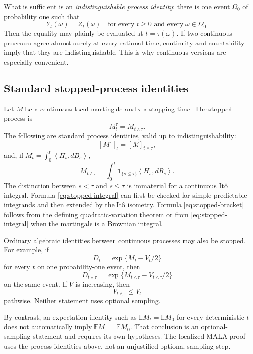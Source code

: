 \documentclass[11pt]{article}
\newcommand{\E}{\mathbb E}
\newcommand{\ip}[2]{\left\langle #1,#2\right\rangle}
\newcommand{\1}{\mathbf 1}
\begin{document}
What is sufficient is an \emph{indistinguishable process identity}: there
is one event \(\Omega_0\) of probability one such that
\[
 Y_t(\omega)=Z_t(\omega)
 \quad\text{for every }t\geq0\text{ and every }\omega\in\Omega_0.
\]
Then the equality may plainly be evaluated at \(t=\tau(\omega)\).  If two
continuous processes agree almost surely at every rational time, continuity
and countability imply that they are indistinguishable.  This is why
continuous versions are especially convenient.

\subsection{Standard stopped-process identities}

Let \(M\) be a continuous local martingale and \(\tau\) a stopping time.
The stopped process is
\[
 M_t^\tau=M_{t\wedge\tau}.
\]
The following are standard process identities, valid up to
indistinguishability:
\begin{equation}\label{eq:stopped-bracket}
 [M^\tau]_t=[M]_{t\wedge\tau},
\end{equation}
and, if
\(M_t=\int_0^t\ip{H_s}{dB_s}\),
\begin{equation}\label{eq:stopped-integral}
 M_{t\wedge\tau}
 =\int_0^t\1_{\{s\leq\tau\}}\ip{H_s}{dB_s}.
\end{equation}
The distinction between \(s<\tau\) and \(s\leq\tau\) is immaterial for a
continuous It\^o integral.  Formula \eqref{eq:stopped-integral} can first be
checked for simple predictable integrands and then extended by the It\^o
isometry.  Formula \eqref{eq:stopped-bracket} follows from the defining
quadratic-variation theorem or from \eqref{eq:stopped-integral} when the
martingale is a Brownian integral.

Ordinary algebraic identities between continuous processes may also be
stopped.  For example, if
\[
 D_t=\exp\{M_t-V_t/2\}
\]
for every \(t\) on one probability-one event, then
\[
 D_{t\wedge\tau}
 =\exp\{M_{t\wedge\tau}-V_{t\wedge\tau}/2\}
\]
on the same event.  If \(V\) is increasing, then
\[
 V_{t\wedge\tau}\leq V_t
\]
pathwise.  Neither statement uses optional sampling.

By contrast, an expectation identity such as \(\E M_t=\E M_0\) for every
deterministic \(t\) does not automatically imply
\(\E M_\tau=\E M_0\).  That conclusion is an optional-sampling statement
and requires its own hypotheses.  The localized MALA proof uses the
process identities above, not an unjustified optional-sampling step.
\end{document}
